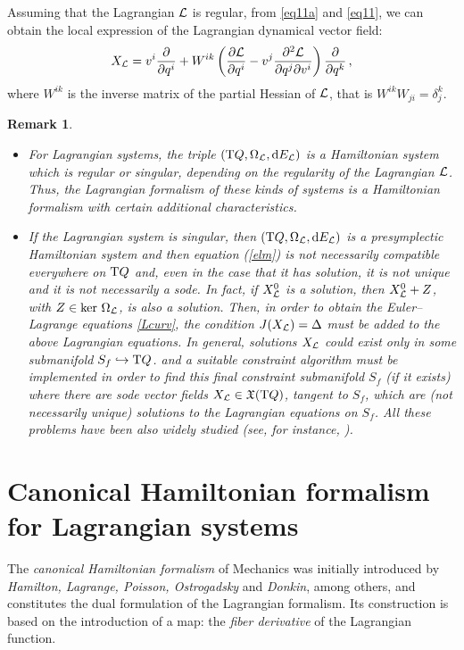 \documentclass[12pt]{report}
\newtheorem{remark}[teor]{Remark}
\def\bit{\begin{itemize}}
\def\eit{\end{itemize}}
\def\derpar#1#2{\frac{\partial{#1}}{\partial{#2}}}
\def\vf{\mathfrak X}
\def\Lag{{\cal L}}
\def\d{{\rm d}}
\def\Tan{{\rm T}}
\begin{document}
Assuming that the Lagrangian $\Lag$ is regular, from \eqref{eq11a} and \eqref{eq11}, we can obtain the local expression of the Lagrangian dynamical vector field:
\begin{equation}\label{lagdynvf}
 X_\Lag= v^i\derpar{}{q^i}+
 W^{ik}\left(\derpar{\Lag}{q^i}
 -v^j\frac{\partial^2\Lag}{\partial q^j \partial v^i}\right)\derpar{}{q^k}\, ,
\end{equation}
where $ W^{ik}$ is the inverse matrix of the partial Hessian of $\Lag$, that is 
$ W^{ik}W_{ji}=\delta^k_j$.

\begin{remark}{\rm 
\bit
\item
For Lagrangian systems, the triple
$(\Tan Q,\Omega_{\Lag},\d E_{\Lag})$ is a Hamiltonian system
which is regular or singular, depending on the regularity of the Lagrangian $\Lag$.
Thus, the Lagrangian formalism of these kinds of systems is a Hamiltonian formalism
with certain additional characteristics.
\item
If the Lagrangian system is singular, then $(\Tan Q,\Omega_{\Lag},\d E_{\Lag})$
is a presymplectic Hamiltonian system and then equation (\ref{elm})
is not necessarily compatible everywhere on $\Tan Q$ 
and, even in the case that it has solution,
it is not unique and it is not necessarily a {\sc sode}.
In fact, if $X_\Lag^0$ is a solution, then $X_\Lag^0+Z$, with 
$Z\in\ker\,\Omega_\Lag$, is also a solution.
Then, in order to obtain the Euler--Lagrange equations \eqref{Lcurv},
the condition $J(X_\Lag)=\Delta$ must be added to the above Lagrangian equations.
In general, solutions $X_\Lag$ could exist only in some submanifold $S_f\hookrightarrow\Tan Q$.
and a suitable {\sl constraint algorithm} must be implemented in order to find 
this {\sl final constraint submanifold} $S_f$ (if it exists) where there are 
{\sc sode} vector fields $X_{\cal L}\in\vf(\Tan Q)$,
tangent to $S_f$, which are (not necessarily unique) solutions to the Lagrangian equations on $S_f$.
All these problems have been also widely studied
(see, for instance, \cite{BGPR-86,BGPR-87,CLR-87,CLR-88,GN-79,GN-80,Ka-82,MR-92}).
\eit
}\end{remark}


\section{Canonical Hamiltonian formalism for Lagrangian systems}


The {\sl canonical Hamiltonian formalism} of Mechanics was
initially introduced by {\it Hamilton, Lagrange, Poisson,
Ostrogadsky} and {\it Donkin}, among others, and constitutes the dual
formulation of the Lagrangian formalism.
Its construction is based on the introduction of a map:
the {\sl fiber derivative} of the Lagrangian function.
\end{document}
